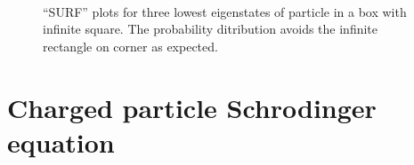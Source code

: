\documentclass[singlepage,notitlepage,nofootinbib,11pt]{revtex4-1}
\begin{document}
\begin{figure}[h]
  \\
  \caption{\label{particles} ``SURF'' plots for three lowest eigenstates of particle in a box with infinite square. The probability ditribution avoids the infinite rectangle on corner as expected.}
\end{figure}

\clearpage
\section{Charged particle Schrodinger equation}
\end{document}
